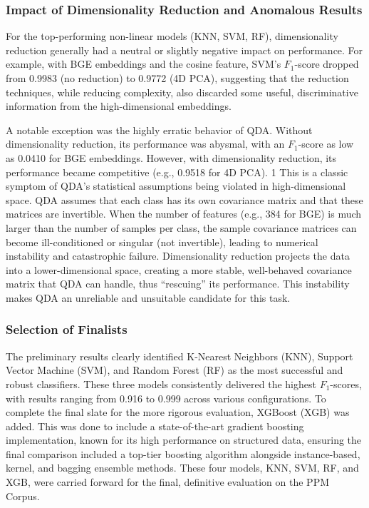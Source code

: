 \subsubsection{Impact of Dimensionality Reduction and Anomalous Results}
For the top-performing non-linear models (KNN, SVM, RF), dimensionality reduction generally had a neutral or slightly negative impact on performance. For example, with BGE embeddings and the cosine feature, SVM's \(F_1\)-score dropped from 0.9983 (no reduction) to 0.9772 (4D PCA), suggesting that the reduction techniques, while reducing complexity, also discarded some useful, discriminative information from the high-dimensional embeddings.

A notable exception was the highly erratic behavior of QDA. Without dimensionality reduction, its performance was abysmal, with an \(F_1\)-score as low as 0.0410 for BGE embeddings. However, with dimensionality reduction, its performance became competitive (e.g., 0.9518 for 4D PCA). 1  This is a classic symptom of QDA's statistical assumptions being violated in high-dimensional space. QDA assumes that each class has its own covariance matrix and that these matrices are invertible. When the number of features (e.g., 384 for BGE) is much larger than the number of samples per class, the sample covariance matrices can become ill-conditioned or singular (not invertible), leading to numerical instability and catastrophic failure. Dimensionality reduction projects the data into a lower-dimensional space, creating a more stable, well-behaved covariance matrix that QDA can handle, thus ``rescuing'' its performance. This instability makes QDA an unreliable and unsuitable candidate for this task.

\subsubsection{Selection of Finalists}
The preliminary results clearly identified K-Nearest Neighbors (KNN), Support Vector Machine (SVM), and Random Forest (RF) as the most successful and robust classifiers. These three models consistently delivered the highest \(F_1\)-scores, with results ranging from 0.916 to 0.999 across various configurations. To complete the final slate for the more rigorous evaluation, XGBoost (XGB) was added. This was done to include a state-of-the-art gradient boosting implementation, known for its high performance on structured data, ensuring the final comparison included a top-tier boosting algorithm alongside instance-based, kernel, and bagging ensemble methods. These four models, KNN, SVM, RF, and XGB, were carried forward for the final, definitive evaluation on the PPM Corpus.

